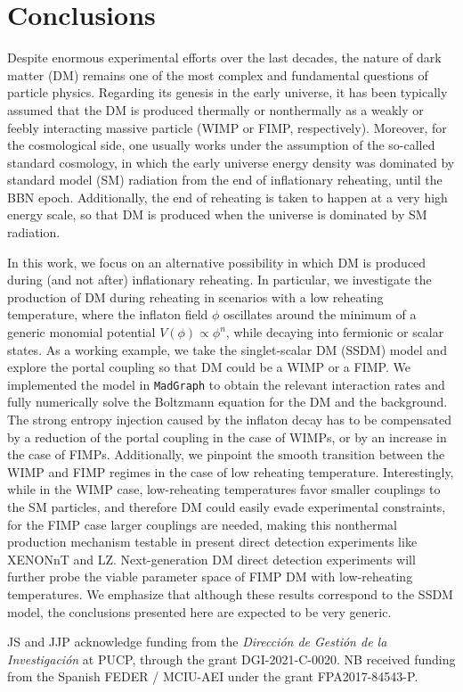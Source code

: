 \documentclass[a4paper,11pt]{article}
\begin{document}
\section{Conclusions} \label{sec:concl}
Despite enormous experimental efforts over the last decades, the nature of dark matter (DM) remains one of the most complex and fundamental questions of particle physics.
Regarding its genesis in the early universe, it has been typically assumed that the DM is produced thermally or nonthermally as a weakly or feebly interacting massive particle (WIMP or FIMP, respectively).
Moreover, for the cosmological side, one usually works under the assumption of the so-called standard cosmology, in which the early universe energy density was dominated by standard model (SM) radiation from the end of inflationary reheating, until the BBN epoch. Additionally, the end of reheating is taken to happen at a very high energy scale, so that DM is produced when the universe is dominated by SM radiation.

In this work, we focus on an alternative possibility in which DM is produced during (and not after) inflationary reheating. In particular,  we investigate the production of DM during reheating in scenarios with a low reheating temperature, where the inflaton field $\phi$ oscillates around the minimum of a generic monomial potential $V(\phi) \propto \phi^n$, while decaying into fermionic or scalar states.
As a working example, we take the singlet-scalar DM (SSDM) model and explore the portal coupling so that DM could be a WIMP or a FIMP.
We implemented the model in \texttt{MadGraph} to obtain the relevant interaction rates and fully numerically solve the Boltzmann equation for the DM and the background.
The strong entropy injection caused by the inflaton decay has to be compensated by a reduction of the portal coupling in the case of WIMPs, or by an increase in the case of FIMPs.
Additionally, we pinpoint the smooth transition between the WIMP and FIMP regimes in the case of low reheating temperature.
Interestingly, while in the WIMP case, low-reheating temperatures favor smaller couplings to the SM particles, and therefore DM could easily evade experimental constraints, for the FIMP case larger couplings are needed, making this nonthermal production mechanism testable in present direct detection experiments like XENONnT and LZ. Next-generation DM direct detection experiments will further probe the viable parameter space of FIMP DM with low-reheating temperatures.
We emphasize that although these results correspond to the SSDM model, the conclusions presented here are expected to be very generic.

\acknowledgments
JS and JJP acknowledge funding from the {\it Dirección de Gestión de la Investigación} at PUCP, through the grant DGI-2021-C-0020.
NB received funding from the Spanish FEDER / MCIU-AEI under the grant FPA2017-84543-P.



\end{document}
